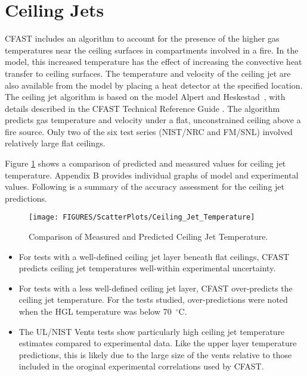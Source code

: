 \section{Ceiling Jets}

CFAST includes an algorithm to account for the presence of the higher gas temperatures near the ceiling surfaces in compartments involved in a fire.  In the model, this increased temperature has the effect of increasing the convective heat transfer to ceiling surfaces.  The temperature and velocity of the ceiling jet are also available from the model by placing a heat detector at the specified location.  The ceiling jet algorithm is based on the model Alpert and Heskestad~\cite{Alpert:SFPE}, with details described in the CFAST Technical Reference Guide \cite{CFAST_Tech_Guide_7}.  The algorithm predicts gas temperature and velocity under a flat, unconstrained ceiling above a fire source.  Only two of the six test series (NIST/NRC and FM/SNL) involved relatively large flat ceilings.

Figure \ref{fig:Ceiling_Jet_Scatter} shows a comparison of predicted and measured values for ceiling jet temperature. Appendix B provides individual graphs of model and experimental values. Following is a summary of the accuracy assessment for the ceiling jet predictions.
\label{Flat Ceiling Jet Temperature}

\begin{figure}
\begin{center}
\texttt{[image: FIGURES/ScatterPlots/Ceiling\_Jet\_Temperature]}  \\
\end{center}
\caption{Comparison of Measured and Predicted Ceiling Jet Temperature.} \label{fig:Ceiling_Jet_Scatter}
\end{figure}

\begin{itemize}
\item For tests with a well-defined ceiling jet layer beneath flat ceilings, CFAST predicts ceiling jet temperatures well-within experimental uncertainty.
\item For tests with a less well-defined ceiling jet layer, CFAST over-predicts the ceiling jet temperature.  For the tests studied, over-predictions were noted when the HGL temperature was below 70~$^\circ$C.
\item The UL/NIST Vents tests show particularly high ceiling jet temperature estimates compared to experimental data.  Like the upper layer temperature predictions, this is likely due to the large size of the vents relative to those included in the oroginal experimental correlations used by CFAST.
\end{itemize}

